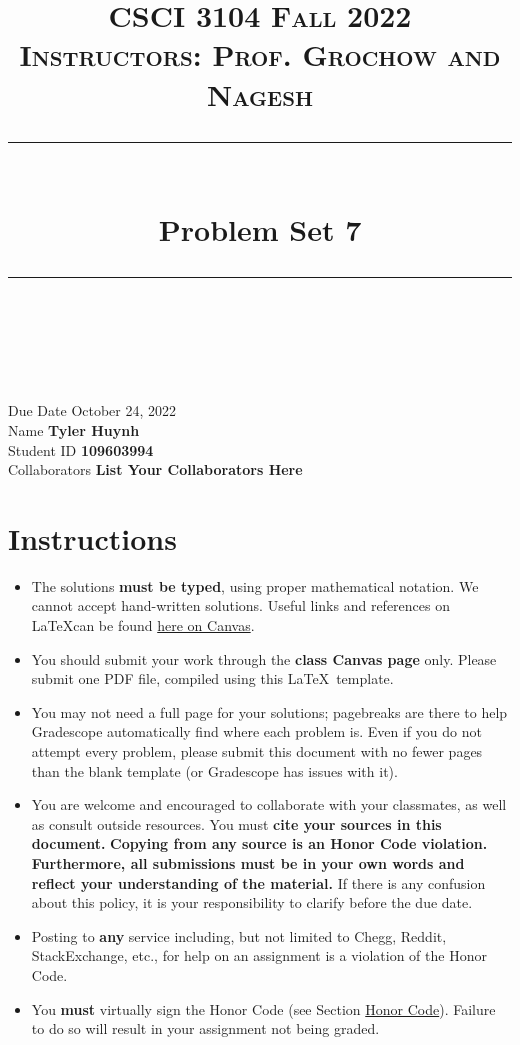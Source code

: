 \documentclass[11pt]{article}
\title{
\normalfont \normalsize 
\textsc{CSCI 3104 Fall 2022 \\ 
Instructors: Prof. Grochow and Nagesh} \\
[10pt] 
\rule{\linewidth}{0.5pt} \\[6pt] 
\huge Problem Set 7 \\
\rule{\linewidth}{2pt}  \\[10pt]
}
\date{}
\theoremstyle{definition}
\theoremstyle{definition}
\theoremstyle{definition}
\begin{document}

\maketitle


\noindent
Due Date \dotfill October 24, 2022 \\
Name \dotfill \textbf{Tyler Huynh} \\
Student ID \dotfill \textbf{109603994} \\
Collaborators \dotfill \textbf{List Your Collaborators Here}

\renewcommand{\thesubsection}{\arabic{section}(\alph{subsection}). }

\tableofcontents

\section*{Instructions}
 \begin{itemize}
	\item The solutions \textbf{must be typed}, using proper mathematical notation. We cannot accept hand-written solutions. Useful links and references on \LaTeX can be found \href{https://canvas.colorado.edu/courses/75824/pages/latex}{here on Canvas}.
	\item You should submit your work through the \textbf{class Canvas page} only. Please submit one PDF file, compiled using this \LaTeX \ template.
	\item You may not need a full page for your solutions; pagebreaks are there to help Gradescope automatically find where each problem is. Even if you do not attempt every problem, please submit this document with no fewer pages than the blank template (or Gradescope has issues with it).

	\item You are welcome and encouraged to collaborate with your classmates, as well as consult outside resources. You must \textbf{cite your sources in this document.} \textbf{Copying from any source is an Honor Code violation. Furthermore, all submissions must be in your own words and reflect your understanding of the material.} If there is any confusion about this policy, it is your responsibility to clarify before the due date. 

	\item Posting to \textbf{any} service including, but not limited to Chegg, Reddit, StackExchange, etc., for help on an assignment is a violation of the Honor Code.

	\item You \textbf{must} virtually sign the Honor Code (see Section \hyperlink{HonorCode}{Honor Code}). Failure to do so will result in your assignment not being graded.
\end{itemize}
\end{document}
